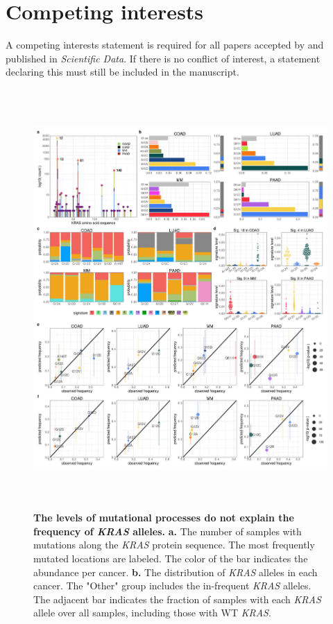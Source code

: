 \documentclass[english, 12pt, letterpaper]{article}
\newcommand{\KRAS}{\emph{KRAS}}
\begin{document}
\section*{Competing interests}

A competing interests statement is required for all papers accepted by and published in \emph{Scientific Data}. If there is no conflict of interest, a statement declaring this must still be included in the manuscript.



{}



\begin{figure}[p]
\centering
\includegraphics[height=160mm]{figures/Figure_01.jpeg}
\caption{
    \textbf{The levels of mutational processes do not explain the frequency of \KRAS{} alleles.}
    \textbf{a.} The number of samples with mutations along the \KRAS{} protein sequence. The most frequently mutated locations are labeled. The color of the bar indicates the abundance per cancer. 
    \textbf{b.} The distribution of \KRAS{} alleles in each cancer. The "Other" group includes the in-frequent \KRAS{} alleles. The adjacent bar indicates the fraction of samples with each \KRAS{} allele over all samples, including those with WT \KRAS{}.
}
\end{figure}
\end{document}
